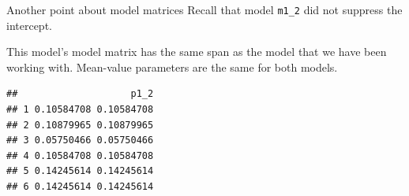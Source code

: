 \documentclass[
  ignorenonframetext,
]{beamer}
\newenvironment{Shaded}{\begin{snugshade}}{\end{snugshade}}
\newcommand{\AttributeTok}[1]{\textcolor[rgb]{0.77,0.63,0.00}{#1}}
\newcommand{\ConstantTok}[1]{\textcolor[rgb]{0.00,0.00,0.00}{#1}}
\newcommand{\DecValTok}[1]{\textcolor[rgb]{0.00,0.00,0.81}{#1}}
\newcommand{\FunctionTok}[1]{\textcolor[rgb]{0.00,0.00,0.00}{#1}}
\newcommand{\NormalTok}[1]{#1}
\newcommand{\OtherTok}[1]{\textcolor[rgb]{0.56,0.35,0.01}{#1}}
\newcommand{\SpecialCharTok}[1]{\textcolor[rgb]{0.00,0.00,0.00}{#1}}
\newcommand{\StringTok}[1]{\textcolor[rgb]{0.31,0.60,0.02}{#1}}
\begin{document}
\begin{frame}[fragile]{Another point about model matrices}
\protect\hypertarget{another-point-about-model-matrices}{}
Recall that model \texttt{m1\_2} did not suppress the intercept.

\vspace{12pt}

This model's model matrix has the same span as the model that we have
been working with. Mean-value parameters are the same for both models.

\vspace{12pt}
\small

\begin{Shaded}
\end{Shaded}

\begin{verbatim}
##                    p1_2
## 1 0.10584708 0.10584708
## 2 0.10879965 0.10879965
## 3 0.05750466 0.05750466
## 4 0.10584708 0.10584708
## 5 0.14245614 0.14245614
## 6 0.14245614 0.14245614
\end{verbatim}
\end{frame}
\end{document}
